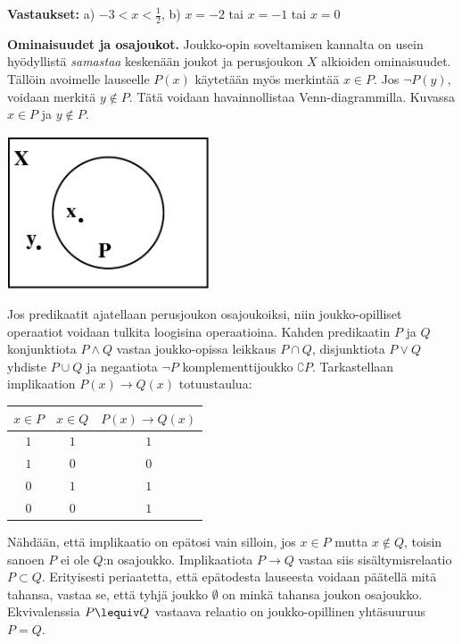 {\bf Vastaukset:} a) $-3 < x < \frac{1}{2}$, b) $x = -2$ tai $x = -1$ tai $x = 0$

{\bf Ominaisuudet ja osajoukot.}
Jouk\-ko-opin soveltamisen kannalta on usein hyödyllistä {\em samastaa} keskenään joukot ja perusjoukon $X$ alkioiden ominaisuudet. Tällöin avoimelle lauseelle $P(x)$ käytetään myös merkintää $x\in P$. Jos $\lnot P(y)$, voidaan merkitä $y\notin P$. Tätä voidaan havainnollistaa Venn-diagrammilla. Kuvassa $x\in P$ ja $y\notin P$.

\begin{center}
\includegraphics[width=6cm]{kuvat/kuuluu}
\end{center}

Jos predikaatit ajatellaan perusjoukon osajoukoiksi, niin joukko-opil\-li\-set operaatiot voidaan tulkita loogisina operaatioina. Kahden predikaatin $P$ ja $Q$ konjunktiota $P\land Q$ vastaa joukko-opissa leikkaus $P\cap Q$, disjunktiota $P \lor Q$ yhdiste $P\cup Q$ ja negaatiota $\lnot P$ komplementtijoukko $\complement P$. 
Tarkastellaan implikaation $P(x)\to Q(x)$ totuustaulua:

\bigskip

\begin{center}
\begin{tabular}{|c|c|c|}\hline
$x\in P$ & $x \in Q$ & $P(x) \to Q(x)$ \\ \hline
$1$ & $1$ & $1$\\ %
$1$ & $0$ & $0$\\
$0$ & $1$ & $1$\\
$0$ & $0$ & $1$\\ \hline
\end{tabular}
\end{center}

\bigskip

Nähdään, että implikaatio on epätosi vain silloin, jos $x \in P$ mutta $x\not \in Q$, toisin sanoen $P$ ei ole $Q$:n osajoukko. Implikaatiota $P \to Q$ vastaa siis sisältymisrelaatio $P \subset Q$. Erityisesti periaatetta, että epätodesta lauseesta voidaan päätellä mitä tahansa, vastaa se, että tyhjä joukko $\emptyset$ on minkä tahansa joukon osajoukko. Ekvivalenssia $P\lequiv Q$ vastaava relaatio on joukko-opillinen yhtäsuuruus $P=Q$.


